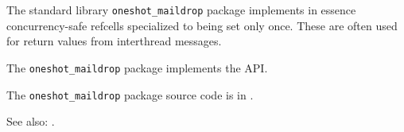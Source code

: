
The standard library {\tt oneshot\_maildrop} package implements in essence concurrency-safe refcells specialized to being set only once.
These are often used for return values from interthread messages.

The {\tt oneshot\_maildrop} package implements the  API.

The {\tt oneshot\_maildrop} package source code is in .

See also: .



